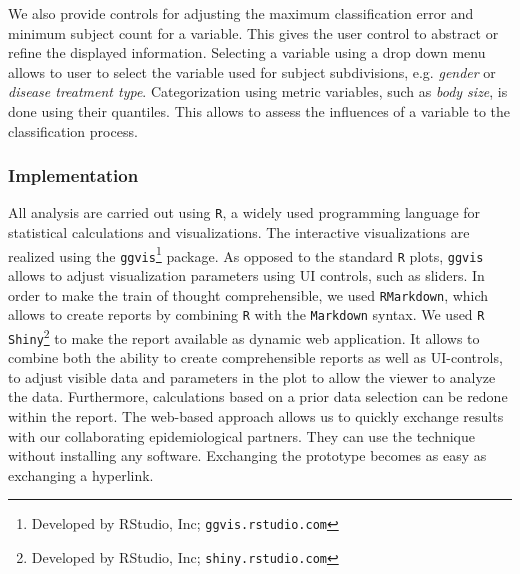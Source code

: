 \documentclass[a4paper,twoside]{style/article}
\begin{document}
We also provide controls for adjusting the maximum classification error and minimum subject count for a variable.
This gives the user control to abstract or refine the displayed information.
Selecting a variable using a drop down menu allows to user to select the variable used for subject subdivisions, e.g. \emph{gender} or \emph{disease treatment type}.
Categorization using metric variables, such as \emph{body size}, is done using their quantiles.
This allows to assess the influences of a variable to the classification process.
\subsubsection{Implementation}
All analysis are carried out using \texttt{R}, a widely used programming language for statistical calculations and visualizations.
The interactive visualizations are realized using the \texttt{ggvis}\footnote{Developed by RStudio, Inc; \texttt{ggvis.rstudio.com}} package.
As opposed to the standard \texttt{R} plots, \texttt{ggvis} allows to adjust visualization parameters using UI controls, such as sliders.
In order to make the train of thought comprehensible, we used \texttt{RMarkdown}, which allows to create reports by combining \texttt{R} with the \texttt{Markdown} syntax.
We used \texttt{R Shiny}\footnote{Developed by RStudio, Inc; \texttt{shiny.rstudio.com}} to make the report available as dynamic web application.
It allows to combine both the ability to create comprehensible reports as well as UI-controls, to adjust visible data and parameters in the plot to allow the viewer to analyze the data.
Furthermore, calculations based on a prior data selection can be redone within the report.
The web-based approach allows us to quickly exchange results with our collaborating epidemiological partners.
They can use the technique without installing any software.
Exchanging the prototype becomes as easy as exchanging a hyperlink.
\end{document}
